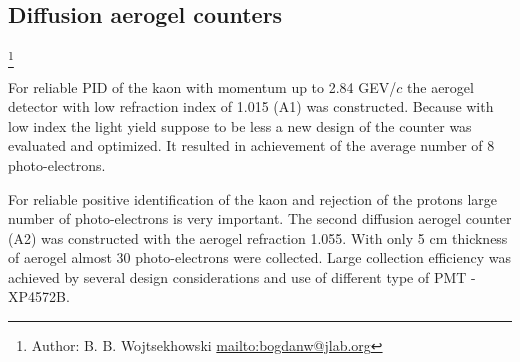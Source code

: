 \subsection [Diffusion aerogel counters] {Diffusion aerogel counters}

\footnote{Author: B. B. Wojtsekhowski \url{mailto:bogdanw@jlab.org}}

For reliable PID of the kaon with momentum up to 2.84 GEV/$c$ 
the aerogel detector with low refraction index of 1.015 (A1) was constructed.
Because with low index the light yield suppose to be less a new design
of the counter was evaluated and optimized. It resulted in
achievement of the average number of 8 photo-electrons. 

For reliable positive identification of the kaon and rejection of the protons 
large number of photo-electrons is very important. The second  diffusion
aerogel counter (A2) was constructed with the aerogel refraction 1.055. 
With only 5 cm thickness of aerogel almost 30 photo-electrons were collected. 
Large collection efficiency was achieved by several design considerations and
use of different type of PMT - XP4572B.


